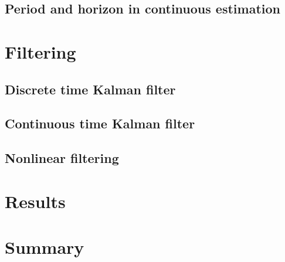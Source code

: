\subsection{\color{red}Period and horizon in continuous estimation}


\section{\color{red}Filtering}

\subsection{\color{red}Discrete time Kalman filter}

\subsection{\color{red}Continuous time Kalman filter}

\subsection{\color{red}Nonlinear filtering}


\section{\color{red}Results}


\section{\color{red}Summary}

